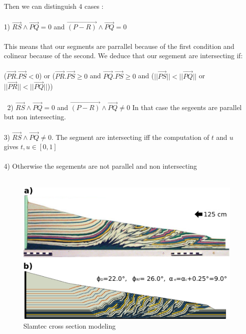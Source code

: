 \documentclass[12pt, a4paper]{memoir} %
\begin{document}
Then we can distinguish $4$ cases :\\\\
1) $ \overrightarrow{RS} \wedge \overrightarrow{PQ} = 0$ and $\overrightarrow{(P - R)} \wedge \overrightarrow{PQ} = 0$\\\\
This means that our segments are parrallel because of the first condition and colinear because of the second. We deduce that our segement are intersecting if: \\\\ 
($\overrightarrow{PR}.\overrightarrow{PS} < 0$) or ($\overrightarrow{PR}.\overrightarrow{PS} \geq 0$ and $\overrightarrow{PQ}.\overrightarrow{PS} \geq 0$ and ($||\overrightarrow{PS}|| < ||\overrightarrow{PQ}||$ or $||\overrightarrow{PR}|| < ||\overrightarrow{PQ}||$))
\\\\\
2)  $ \overrightarrow{RS} \wedge \overrightarrow{PQ} = 0$ and $\overrightarrow{(P - R)} \wedge \overrightarrow{PQ} \neq 0$
In that case the segeents are parallel but non intersecting.\\\\
3)  $ \overrightarrow{RS} \wedge \overrightarrow{PQ} \neq 0$.
The segment are intersecting iff the computation of $t$ and $u$ gives $t,u \in [0,1]$\\\\
4) Otherwise the segements are not parallel and non intersecting\\\\
\begin{figure}[H]
	\centering
	\includegraphics[scale=0.5]{slamtec.png}
	\caption{Slamtec cross section modeling}
\end{figure}



\end{document}
